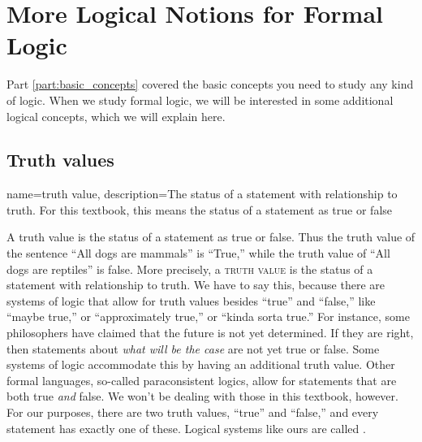 \section{More Logical Notions for Formal Logic}
\label{sec:other_logical_notions}
\setlength{\parindent}{1em}

Part \ref{part:basic_concepts} covered the basic concepts you need to study any kind of logic. When we study formal logic, we will be interested in some additional logical concepts, which we will explain here. 


\subsection{Truth values}

{
  name=truth value,
  description={The status of a statement with relationship to truth. For  this textbook, this means the status of a statement as true or false}
}


A truth value is the status of a statement as true or false. Thus the truth value of the sentence ``All dogs are mammals'' is ``True,'' while the truth value of ``All dogs are reptiles'' is false. More precisely, a \textsc{\gls{truth value}} \label{def:Truth_value} is the status of a statement with relationship to truth. We have to say this, because there are systems of logic that allow for truth values besides ``true'' and ``false,'' like ``maybe true,'' or ``approximately true,'' or ``kinda sorta true.'' For instance, some philosophers have claimed that the future is not yet determined. If they are right, then statements about \emph{what will be the case} are not yet true or false. Some systems of logic accommodate this by having an additional truth value. Other formal languages, so-called paraconsistent logics, allow for statements that are both true \emph{and} false. We won't be dealing with those in this textbook, however. For our purposes, there are two truth values, ``true'' and ``false,'' and every statement has exactly one of these. Logical systems like ours are called . \label{defBivalent}








